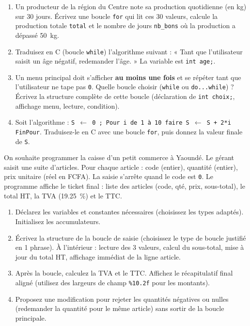 \documentclass[11pt]{article}
\begin{document}
\begin{exercice}
\begin{enumerate}
    \item Un producteur de la région du Centre note sa production quotidienne (en kg) sur 30 jours. Écrivez une boucle \texttt{for} qui lit ces 30 valeurs, calcule la production totale \texttt{total} et le nombre de jours \texttt{nb\_bons} où la production a dépassé \SI{50}{kg}.
    \item Traduisez en C (boucle \texttt{while}) l'algorithme suivant : « Tant que l'utilisateur saisit un âge négatif, redemander l'âge. » La variable est \texttt{int age;}.
    \item Un menu principal doit s'afficher \textbf{au moins une fois} et se répéter tant que l'utilisateur ne tape pas \texttt{0}. Quelle boucle choisir (\texttt{while} ou \texttt{do...while}) ? Écrivez la structure complète de cette boucle (déclaration de \texttt{int choix;}, affichage menu, lecture, condition).
    \item Soit l'algorithme : \texttt{S $\leftarrow$ 0 ; Pour i de 1 à 10 faire S $\leftarrow$ S + 2*i FinPour}. Traduisez-le en C avec une boucle \texttt{for}, puis donnez la valeur finale de \texttt{S}.
\end{enumerate}
\end{exercice}

\begin{exercice}
On souhaite programmer la caisse d'un petit commerce à Yaoundé. Le gérant saisit une suite d'articles. Pour chaque article : code (entier), quantité (entier), prix unitaire (réel en FCFA). La saisie s'arrête quand le code est \texttt{0}. Le programme affiche le ticket final : liste des articles (code, qté, prix, sous-total), le total HT, la TVA (\SI{19.25}{\%}) et le TTC.
\begin{enumerate}
    \item Déclarez les variables et constantes nécessaires (choisissez les types adaptés). Initialisez les accumulateurs.
    \item Écrivez la structure de la boucle de saisie (choisissez le type de boucle justifié en 1 phrase). À l'intérieur : lecture des 3 valeurs, calcul du sous-total, mise à jour du total HT, affichage immédiat de la ligne article.
    \item Après la boucle, calculez la TVA et le TTC. Affichez le récapitulatif final aligné (utilisez des largeurs de champ \texttt{\%10.2f} pour les montants).
    \item Proposez une modification pour rejeter les quantités négatives ou nulles (redemander la quantité pour le même article) sans sortir de la boucle principale.
\end{enumerate}
\end{exercice}
\end{document}
